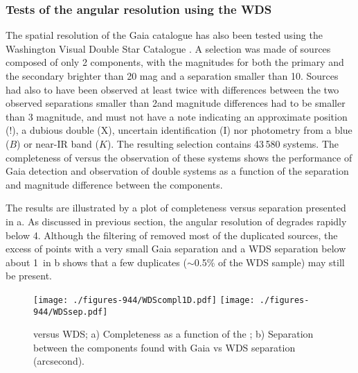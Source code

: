 \subsubsection{Tests of the angular resolution using the WDS}\label{ssec:angular-resolution-944}

The spatial resolution of the Gaia catalogue has also been tested using the Washington Visual Double Star Catalogue \citep[WDS,][]{WDS}. A selection was made of sources composed of only 2 components, with the magnitudes for both the primary and the secondary brighter than 20 mag and a separation smaller than 10\arcsec. Sources had also to have been observed at least twice with differences between the two observed separations smaller than 2\arcsec and magnitude differences had to be smaller than 3 magnitude, and must not have a note indicating an approximate position (!), a dubious double (X), uncertain identification (I) nor photometry from a blue ($B$) or near-IR band ($K$). 
The resulting selection contains 43\,580 systems. The completeness of {} versus the observation of these systems shows the performance of Gaia detection and observation of double systems as a function of the separation and magnitude difference between the components. 

The results are illustrated by a plot of completeness versus separation presented in a. As discussed in previous section, the angular resolution of {} degrades rapidly below 4\arcsec. Although the filtering of {} removed most of the duplicated sources, 
the excess of points with a very small Gaia separation and a WDS separation below about 1\arcsec\ 
in b shows that a few duplicates ($\sim$0.5\% of the WDS sample) may still be present.


\begin{figure}
    \begin{center}
        \texttt{[image: ./figures-944/WDScompl1D.pdf]}
        \hspace{0.05\columnwidth}
        \texttt{[image: ./figures-944/WDSsep.pdf]}
        \caption[Visual double stars completeness versus WDS]{ versus WDS; a) Completeness as a function of the ; 
        b) Separation between the components found with Gaia vs WDS separation (arcsecond).}
        \label{fig:wp944_WDS} 
    \end{center}
\end{figure}

